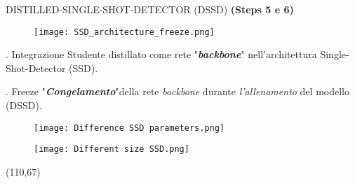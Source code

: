 \begin{frame}{DISTILLED-SINGLE-SHOT-DETECTOR (DSSD)}
    {\bfseries{\scriptsize{(Steps 5 e 6)}}}
    \vspace{-1.8cm}
    \begin{figure}
        \centering
        \texttt{[image: SSD\_architecture\_freeze.png]}
        \centering
    \end{figure}
    \vspace{-0.5cm}
    \begin{minipage}{\linewidth}
        \centering
        \begin{minipage}{0.40\linewidth}
            {\footnotesize
                \vspace{-0.3cm}
                \begin{block}{. Integrazione}
                    Studente distillato come rete "{\bfseries{\emph{backbone}}}" nell'architettura {Single-Shot-Detector (SSD)}.    
                \end{block}
                \vspace{-0.2cm}
                \begin{block}{. Freeze}
                    "{\bfseries{\emph{Congelamento}}}"della rete \emph{backbone} durante \emph{l'allenamento} del modello (DSSD).
                \end{block}
            }%
        \end{minipage}
        \begin{minipage}{0.55\linewidth}
            \begin{figure}
                \centering
                \texttt{[image: Difference SSD parameters.png]}
                \centering
            \end{figure}
            \vspace{-0.7cm}
            \begin{figure}
                \centering
                \texttt{[image: Different size SSD.png]}
                \centering
            \end{figure}
        \end{minipage}
        \vspace{-2.5cm}
    \end{minipage}   
    \begin{textblock}{10}(110,67)
    \end{textblock}
\end{frame}

